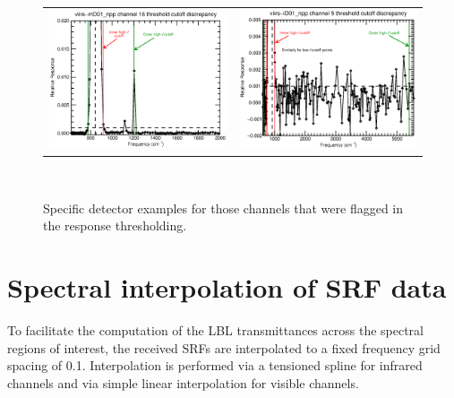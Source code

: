 \begin{figure}[H]
\begin{tabular}{c c}
    \includegraphics[bb= 0 15 404 300,clip,scale=0.6]{graphics/viirs-mD01_npp-ch16-zoom.eps} &
    \includegraphics[bb=19 15 400 300,clip,scale=0.6]{graphics/viirs-iD01_npp-ch5-zoom.eps}
  \end{tabular} \\
  \caption{Specific detector examples for those channels that were flagged in the response thresholding.}
  \label{fig:threshold_channels}
\end{figure}


\newpage
\section{Spectral interpolation of SRF data}
To facilitate the computation of the LBL transmittances across the spectral regions of interest, the received SRFs are interpolated to a fixed frequency grid spacing of 0.1\invcm{}. Interpolation is performed via a tensioned spline for infrared channels and via simple linear interpolation for visible channels.

